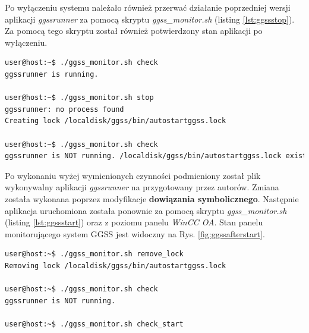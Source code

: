 \newpage
Po wyłączeniu systemu należało również przerwać działanie poprzedniej wersji aplikacji \textit{ggssrunner} za pomocą skryptu \textit{ggss\_monitor.sh} (listing \ref{lst:ggssstop}). Za pomocą tego skryptu został również potwierdzony stan aplikacji po wyłączeniu.


\begin{lstlisting}[language=bash, caption={Zatrzymanie działania aplikacji \textit{ggssrunner}}, label={lst:ggssstop}]
user@host:~$ ./ggss_monitor.sh check
ggssrunner is running.

user@host:~$ ./ggss_monitor.sh stop
ggssrunner: no process found
Creating lock /localdisk/ggss/bin/autostartggss.lock

user@host:~$ ./ggss_monitor.sh check
ggssrunner is NOT running. /localdisk/ggss/bin/autostartggss.lock exists. Remove it or start GGSS manually
\end{lstlisting}



Po wykonaniu wyżej wymienionych czynności podmieniony został plik wykonywalny aplikacji \textit{ggssrunner} na przygotowany przez autorów. Zmiana została wykonana poprzez modyfikacje \textbf{dowiązania symbolicznego}. Następnie aplikacja uruchomiona została ponownie za pomocą skryptu \textit{ggss\_monitor.sh} (listing \ref{lst:ggssstart}) oraz z poziomu panelu \textit{WinCC OA}. Stan panelu monitorującego system GGSS jest widoczny na Rys. \ref{fig:ggssafterstart}.

\begin{lstlisting}[language=bash, caption={Ponowne uruchomienie aplikacji \textit{ggssrunner}}, label={lst:ggssstart}]
user@host:~$ ./ggss_monitor.sh remove_lock
Removing lock /localdisk/ggss/bin/autostartggss.lock

user@host:~$ ./ggss_monitor.sh check
ggssrunner is NOT running.

user@host:~$ ./ggss_monitor.sh check_start
\end{lstlisting}

